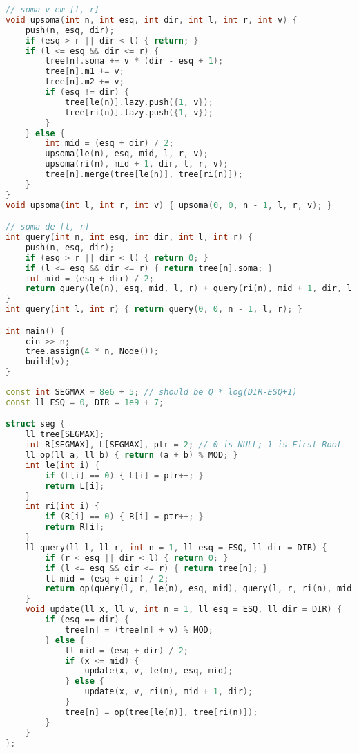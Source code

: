 \documentclass[11pt, a4paper, twoside]{article}
\begin{document}
\begin{lstlisting}[language=C++]
// soma v em [l, r]
void upsoma(int n, int esq, int dir, int l, int r, int v) {
    push(n, esq, dir);
    if (esq > r || dir < l) { return; }
    if (l <= esq && dir <= r) {
        tree[n].soma += v * (dir - esq + 1);
        tree[n].m1 += v;
        tree[n].m2 += v;
        if (esq != dir) {
            tree[le(n)].lazy.push({1, v});
            tree[ri(n)].lazy.push({1, v});
        }
    } else {
        int mid = (esq + dir) / 2;
        upsoma(le(n), esq, mid, l, r, v);
        upsoma(ri(n), mid + 1, dir, l, r, v);
        tree[n].merge(tree[le(n)], tree[ri(n)]);
    }
}
void upsoma(int l, int r, int v) { upsoma(0, 0, n - 1, l, r, v); }

// soma de [l, r]
int query(int n, int esq, int dir, int l, int r) {
    push(n, esq, dir);
    if (esq > r || dir < l) { return 0; }
    if (l <= esq && dir <= r) { return tree[n].soma; }
    int mid = (esq + dir) / 2;
    return query(le(n), esq, mid, l, r) + query(ri(n), mid + 1, dir, l, r);
}
int query(int l, int r) { return query(0, 0, n - 1, l, r); }

int main() {
    cin >> n;
    tree.assign(4 * n, Node());
    build(v);
}
\end{lstlisting}

\begin{lstlisting}[language=C++]
const int SEGMAX = 8e6 + 5; // should be Q * log(DIR-ESQ+1)
const ll ESQ = 0, DIR = 1e9 + 7;

struct seg {
    ll tree[SEGMAX];
    int R[SEGMAX], L[SEGMAX], ptr = 2; // 0 is NULL; 1 is First Root
    ll op(ll a, ll b) { return (a + b) % MOD; }
    int le(int i) {
        if (L[i] == 0) { L[i] = ptr++; }
        return L[i];
    }
    int ri(int i) {
        if (R[i] == 0) { R[i] = ptr++; }
        return R[i];
    }
    ll query(ll l, ll r, int n = 1, ll esq = ESQ, ll dir = DIR) {
        if (r < esq || dir < l) { return 0; }
        if (l <= esq && dir <= r) { return tree[n]; }
        ll mid = (esq + dir) / 2;
        return op(query(l, r, le(n), esq, mid), query(l, r, ri(n), mid + 1, dir));
    }
    void update(ll x, ll v, int n = 1, ll esq = ESQ, ll dir = DIR) {
        if (esq == dir) {
            tree[n] = (tree[n] + v) % MOD;
        } else {
            ll mid = (esq + dir) / 2;
            if (x <= mid) {
                update(x, v, le(n), esq, mid);
            } else {
                update(x, v, ri(n), mid + 1, dir);
            }
            tree[n] = op(tree[le(n)], tree[ri(n)]);
        }
    }
};
\end{lstlisting}
\end{document}
